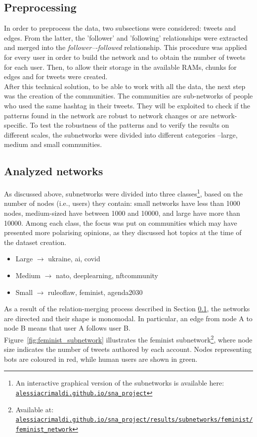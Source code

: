 \documentclass[12pt, a4paper]{article}
\begin{document}
    \subsection{Preprocessing} \label{preprocessing}
    	In order to preprocess the data, two subsections were considered: tweets and edges. From the latter, the 'follower' and 'following' relationships were extracted and merged into the \textit{follower–-followed} relationship. This procedure was applied for every user in order to build the network and to obtain the number of tweets for each user. Then, to allow their storage in the available RAMs, chunks for edges and for tweets were created.\\
        After this technical solution, to be able to work with all the data, the next step was the creation of the communities. The communities are sub-networks of people who used the same hashtag in their tweets. They will be exploited to check if the patterns found in the network are robust to network changes or are network-specific. To test the robustness of the patterns and to verify the results on different scales, the subnetworks were divided into different categories --large, medium and small communities.
	\subsection{Analyzed networks}
    	As discussed above, subnetworks were divided into three classes\footnote{An interactive graphical version of the subnetworks is available here:\\ \href{https://alessiacrimaldi.github.io/sna_project}{\texttt{alessiacrimaldi.github.io/sna\_project}}}, based on the number of nodes (i.e., users) they contain: small networks have less than 1000 nodes, medium-sized have between 1000 and 10000, and large have more than 10000. Among each class, the focus was put on communities which may have presented more polarising opinions, as they discussed hot topics at the time of the dataset creation.
    	\begin{itemize}
			\item Large $\rightarrow$ ukraine, ai, covid
			\item Medium $\rightarrow$ nato, deeplearning, nftcommunity
			\item Small $\rightarrow$ ruleoflaw, feminist, agenda2030
		\end{itemize}
		As a result of the relation-merging process described in Section \ref{preprocessing}, the networks are directed and their shape is monomodal. In particular, an edge from node A to node B means that user A follows user B.\\
		Figure~\ref{fig:feminist_subnetwork} illustrates the feminist subnetwork\footnote{Available at:\\ \href{https://alessiacrimaldi.github.io/sna_project/results/subnetworks/feminist/feminist_network}{\texttt{alessiacrimaldi.github.io/sna\_project/results/subnetworks/feminist/feminist\_network}}}, where node size indicates the number of tweets authored by each account. Nodes representing bots are coloured in red, while human users are shown in green.\\
		
\end{document}
